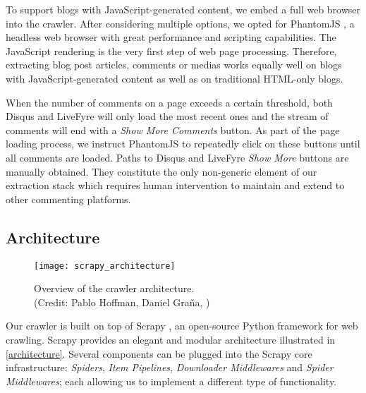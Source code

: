 To support blogs with JavaScript-generated content, we embed a full web browser into the crawler. After considering multiple options, we opted for PhantomJS \cite{phantomjs2013}, a headless web browser with great performance and scripting capabilities. The JavaScript rendering is the very first step of web page processing. Therefore, extracting blog post articles, comments or medias works equally well on blogs with JavaScript-generated content as well as on traditional HTML-only blogs.

When the number of comments on a page exceeds a certain threshold, both Disqus and LiveFyre will only load the most recent ones and the stream of comments will end with a \emph{Show More Comments} button. As part of the page loading process, we instruct PhantomJS to repeatedly click on these buttons until all comments are loaded. Paths to Disqus and LiveFyre \emph{Show More} buttons are manually obtained. They constitute the only non-generic element of our extraction stack which requires human intervention to maintain and extend to other commenting platforms.


\subsection{Architecture}

\begin{figure}
  \capstart
  \centering
  \texttt{[image: scrapy\_architecture]}
  \caption{Overview of the crawler architecture.\\(Credit: Pablo Hoffman, Daniel Graña, \cite{scrapy2013})}
  \label{architecture}
\end{figure}

Our crawler is built on top of Scrapy \cite{scrapy2013}, an open-source Python framework for web crawling. Scrapy provides an elegant and modular architecture illustrated in \autoref{architecture}. Several components can be plugged into the Scrapy core infrastructure: \emph{Spiders}, \emph{Item Pipelines}, \emph{Downloader Middlewares} and \emph{Spider Middlewares}; each allowing us to implement a different type of functionality.

